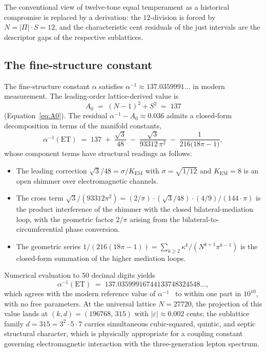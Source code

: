 \documentclass[11pt,a4paper]{article}
\theoremstyle{definition}
\theoremstyle{remark}
\newcommand{\eps}{\varepsilon}
\begin{document}
The conventional view of twelve-tone equal temperament as a historical compromise is replaced by a derivation: the $12$-division is forced by $N=|\Pi|\cdot S=12$, and the characteristic cent residuals of the just intervals are the descriptor gaps of the respective sublattices.

\subsection{The fine-structure constant}\label{subsec:alpha}

The fine-structure constant $\alpha$ satisfies $\alpha^{-1}\approx 137.0359991\ldots$ in modern measurement. The leading-order lattice-derived value is
\[
A_{0} \;=\; (N-1)^{2}+S^{2} \;=\; 137
\]
(Equation~\ref{eq:A0}). The residual $\alpha^{-1}-A_{0} \approx 0.036$ admits a closed-form decomposition in terms of the manifold constants,
\begin{equation}\label{eq:alpha}
\alpha^{-1}(\mathrm{ET}) \;=\; 137 \;+\; \frac{\sqrt{3}}{48} \;-\; \frac{\sqrt{3}}{93312\,\pi^{2}} \;-\; \frac{1}{216\bigl(18\pi - 1\bigr)},
\end{equation}
whose component terms have structural readings as follows:
\begin{itemize}[leftmargin=*]
\item The leading correction $\sqrt{3}/48 = \sigma/K_{\mathrm{EM}}$ with $\sigma = \sqrt{1/12}$ and $K_{\mathrm{EM}} = 8$ is an open shimmer over electromagnetic channels.
\item The cross term $\sqrt{3}/(93312\pi^{2}) = (2/\pi)\cdot(\sqrt{3}/48)\cdot(4/9)/(144\cdot\pi)$ is the product interference of the shimmer with the closed bilateral-mediation loop, with the geometric factor $2/\pi$ arising from the bilateral-to-circumferential phase conversion.
\item The geometric series $1/(216(18\pi-1)) = \sum_{k\ge 2}\kappa^{k}/(N^{k+1}\pi^{k-1})$ is the closed-form summation of the higher mediation loops.
\end{itemize}

Numerical evaluation to $50$ decimal digits yields
\[
\alpha^{-1}(\mathrm{ET}) \;=\; 137.03599916744133748324548\ldots,
\]
which agrees with the modern reference value of $\alpha^{-1}$~\cite{LatComp2025} to within one part in $10^{10}$, with no free parameters. At the universal lattice $N=27720$, the projection of this value lands at $(k,d)=(196768,\,315)$ with $|\eps|\approx 0.002$ cents; the sublattice family $d=315 = 3^{2}\cdot 5\cdot 7$ carries simultaneous cubic-squared, quintic, and septic structural character, which is physically appropriate for a coupling constant governing electromagnetic interaction with the three-generation lepton spectrum.
\end{document}

